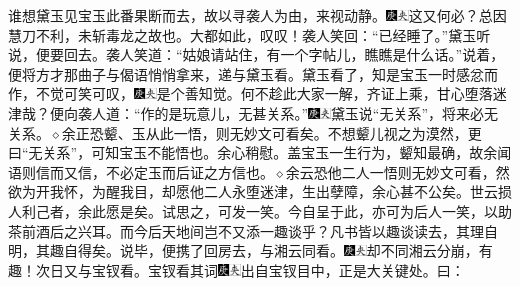 谁想黛玉见宝玉此番果断而去，故以寻袭人为由，来视动静。{\includegraphics[width=3mm]{../Images/00004}\includegraphics[width=3mm]{../Images/00012}\footnotesize \kaishu 这又何必？总因慧刀不利，未斩毒龙之故也。大都如此，叹叹！}袭人笑回：“已经睡了。”黛玉听说，便要回去。袭人笑道：“姑娘请站住，有一个字帖儿，瞧瞧是什么话。”说着，便将方才那曲子与偈语悄悄拿来，递与黛玉看。黛玉看了，知是宝玉一时感忿而作，不觉可笑可叹，{\includegraphics[width=3mm]{../Images/00004}\includegraphics[width=3mm]{../Images/00012}\footnotesize \kaishu 是个善知觉。何不趁此大家一解，齐证上乘，甘心堕落迷津哉？}便向袭人道：“作的是玩意儿，无甚关系。”{\includegraphics[width=3mm]{../Images/00004}\includegraphics[width=3mm]{../Images/00012}\footnotesize \kaishu 黛玉说“无关系”，将来必无关系。{$\diamond$}余正恐颦、玉从此一悟，则无妙文可看矣。不想颦儿视之为漠然，更曰“无关系”，可知宝玉不能悟也。余心稍慰。盖宝玉一生行为，颦知最确，故余闻语则信而又信，不必定玉而后证之方信也。{$\diamond$}余云恐他二人一悟则无妙文可看，然欲为开我怀，为醒我目，却愿他二人永堕迷津，生出孽障，余心甚不公矣。世云损人利己者，余此愿是矣。试思之，可发一笑。今自呈于此，亦可为后人一笑，以助茶前酒后之兴耳。而今后天地间岂不又添一趣谈乎？凡书皆以趣谈读去，其理自明，其趣自得矣。}说毕，便携了回房去，与湘云同看。{\includegraphics[width=3mm]{../Images/00004}\includegraphics[width=3mm]{../Images/00012}\footnotesize \kaishu 却不同湘云分崩，有趣！}次日又与宝钗看。宝钗看其词{\includegraphics[width=3mm]{../Images/00004}\includegraphics[width=3mm]{../Images/00012}\footnotesize \kaishu 出自宝钗目中，正是大关键处。}曰：

